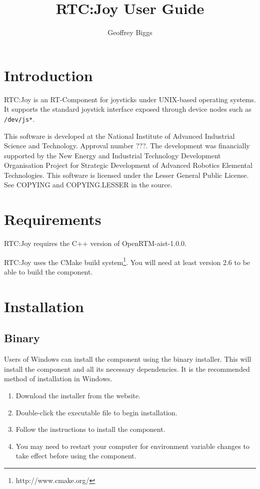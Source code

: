 \documentclass[a4paper,10pt]{article}
\title{RTC:Joy User Guide}
\author{Geoffrey Biggs}
\begin{document}
\maketitle

\section{Introduction}
\label{sec:intro}

RTC:Joy is an RT-Component for joysticks under UNIX-based operating systems. It
supports the standard joystick interface exposed through device nodes such as
\verb|/dev/js*|.

This software is developed at the National Institute of Advanced Industrial
Science and Technology. Approval number ???. The development was financially
supported by the New Energy and Industrial Technology Development Organisation
Project for Strategic Development of Advanced Robotics Elemental Technologies.
This software is licensed under the Lesser General Public License. See COPYING
and COPYING.LESSER in the source.

\section{Requirements}
\label{sec:requirements}

RTC:Joy requires the C++ version of OpenRTM-aist-1.0.0.

RTC:Joy uses the CMake build system\footnote{http://www.cmake.org/}. You will
need at least version 2.6 to be able to build the component.

\section{Installation}
\label{sec:installation}

\subsection{Binary}

Users of Windows can install the component using the binary installer. This
will install the component and all its necessary dependencies. It is the
recommended method of installation in Windows.

\begin{enumerate}
  \item Download the installer from the website.
  \item Double-click the executable file to begin installation.
  \item Follow the instructions to install the component.
  \item You may need to restart your computer for environment variable changes
  to take effect before using the component.
\end{enumerate}
\end{document}
